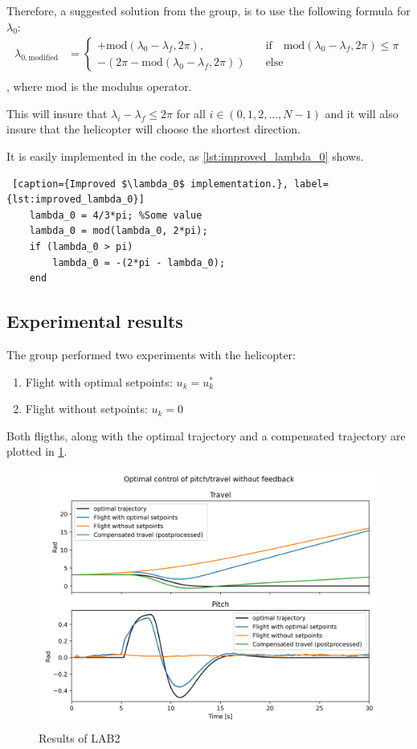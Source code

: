 \documentclass[../main.tex]{subfiles}
\begin{document}
Therefore, a suggested solution from the group, is to use the following formula for $ \lambda_0 $: 
\begin{subequations}
	\begin{align}
		\lambda_{0, \text{modified}} &= \begin{cases}
			+\text{mod}(\lambda_0-\lambda_f, 2\pi), \quad &\text{if} \quad \text{mod}(\lambda_0-\lambda_f, 2\pi) \leq \pi \\
			-(2 \pi - \text{mod}(\lambda_0-\lambda_f, 2\pi)) \quad &\text{else}
		\end{cases} \\ 
	\end{align}
\end{subequations}, where $ \text{mod} $ is the modulus operator.

This will insure that $ \lambda_i-\lambda_f \leq  2\pi $ for all $ i \in (0, 1, 2, ..., N-1) $ and it will also insure that the helicopter will choose the shortest direction.

It is easily implemented in the code, as \cref{lst:improved_lambda_0} shows.
\begin{lstlisting} [caption={Improved $\lambda_0$ implementation.}, label={lst:improved_lambda_0}]
	lambda_0 = 4/3*pi; %Some value
	lambda_0 = mod(lambda_0, 2*pi);
	if (lambda_0 > pi)
		lambda_0 = -(2*pi - lambda_0);
	end
\end{lstlisting} 

\clearpage
\subsection{Experimental results}\label{kap:task_10_2_experimental_results}
The group performed two experiments with the helicopter:
\begin{enumerate}
	\item Flight with optimal setpoints: $u_k = u_k^*$
	\item Flight without setpoints: $u_k = 0$
\end{enumerate}
Both fligths, along with the optimal trajectory and a compensated trajectory are plotted in \cref{fig:LAB2_plot_1}.

\begin{figure}[h]
	\centering
	\includegraphics[width=0.8\linewidth]{figures/LAB2_plot_1.png}
	\caption{Results of LAB2}
	\label{fig:LAB2_plot_1}
\end{figure}
\end{document}
